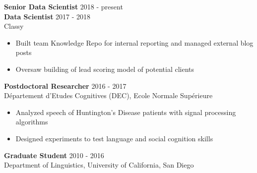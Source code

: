 \documentclass[9pt]{article}
\newenvironment{changemargin}[2]{%
  \begin{list}{}{%
    \setlength{\topsep}{0pt}%
    \setlength{\leftmargin}{#1}%
    \setlength{\rightmargin}{#2}%
    \setlength{\listparindent}{\parindent}%
    \setlength{\itemindent}{\parindent}%
    \setlength{\parsep}{\parskip}%
  }%
  \item[]}{\end{list}
}
\newenvironment{body} {
	\vspace*{-16pt}
	\begin{changemargin}{-0.25in}{-0.5in}
  }	
	{\end{changemargin}
}
\begin{document}
\begin{body}
	\vspace{14pt}
	
	\textbf{Senior Data Scientist} \hfill 2018 - present\\
	\textbf{Data Scientist} \hfill 2017 - 2018\\
	Classy\\
	\begin{itemize}
	        \small
		\item Built team Knowledge Repo for internal reporting and managed external blog posts
		\item Oversaw building of lead scoring model of potential clients 
	\end{itemize}
	\medskip
	\medskip
	
	
	\textbf{Postdoctoral Researcher} \hfill 2016 - 2017\\
	D\'epartement d'Etudes Cognitives (DEC), Ecole Normale Sup\'erieure\\
	\begin{itemize}
		\small
		\item Analyzed speech of Huntington's Disease patients with signal processing algorithms
		\item Designed experiments to test language and social cognition skills
	\end{itemize}
	\medskip
	\medskip
	
	\textbf{Graduate Student} \hfill 2010 - 2016\\
	Department of Linguistics, University of California, San Diego\\
	\medskip
	\medskip
	
\end{body}
\end{document}
